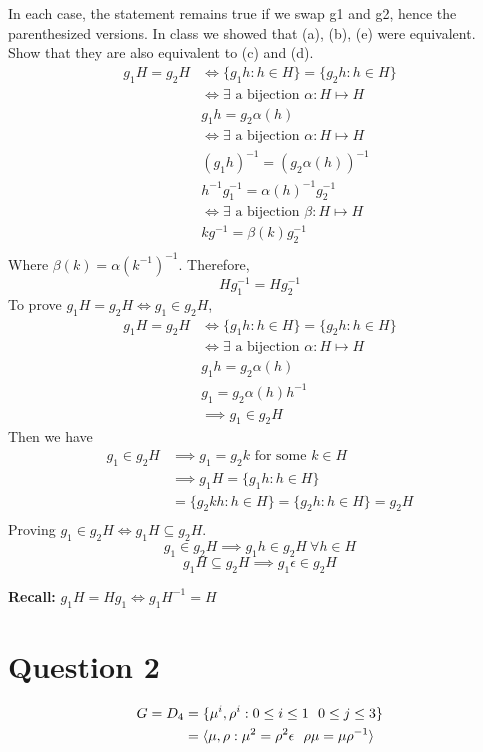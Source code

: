 \documentclass[openany]{report}
\begin{document}
In each case, the statement remains true if we swap g1 and g2, hence the parenthesized versions.
In class we showed that (a), (b), (e) were equivalent. Show that they are also equivalent to (c) and (d).
\begin{align*}
    g_1H = g_2H &\iff \{g_1h : h \in H\} = \{g_2h : h \in H\}\\
    &\iff \exists \text{ a bijection } \alpha: H \mapsto H\\
    &g_1h = g_2\alpha(h)\\
    &\iff \exists \text{ a bijection } \alpha : H \mapsto H\\
    &(g_1h)^{-1} = (g_2\alpha(h))^{-1}\\
    &h^{-1}g_1^{-1} = \alpha(h)^{-1}g_2^{-1}\\
    &\iff \exists \text{ a bijection } \beta : H \mapsto H\\
    &kg^{-1} = \beta(k)g_2^{-1}\\
\end{align*}
Where $\beta(k) = \alpha(k^{-1})^{-1}$. Therefore,
\[Hg_1^{-1} = Hg_2^{-1}\]
To prove $g_1H = g_2H \iff g_1 \in g_2H$, 
\begin{align*}
    g_1H = g_2H &\iff \{g_1h : h \in H\} = \{g_2h : h \in H\}\\
    &\iff \exists \text{ a bijection } \alpha: H \mapsto H\\
    &g_1h = g_2\alpha(h)\\
    &g_1 = g_2\alpha(h)h^{-1}\\
    &\implies g_1 \in g_2H
\end{align*}
Then we have 
\begin{align*}
    g_1 \in g_2H &\implies g_1=g_2k  \text{ for some } k \in H\\
    &\implies g_1H = \{g_1h: h \in H\}\\
    &= \{g_2kh: h \in H\} = \{g_2h: h \in H\} = g_2H\\
\end{align*}
Proving $g_1 \in g_2H \iff g_1H \subseteq g_2H$. 
\[g_1 \in g_2H \implies g_1h \in g_2H \ \forall h \in H\]
\[g_1H \subseteq g_2H \implies g_1 \epsilon \in g_2H\]
\begin{center}
    \textbf{Recall:}
    $g_1H = Hg_1 \iff g_1H^{-1 } = H$
    
\end{center}

\section{Question 2}
\begin{align*}
    G = D_4 &= \{\mu^i, \rho^i: 0 \leq i \leq 1 \ \ 0 \leq j \leq 3\}\\
    &= \bangles{\mu, \rho: \mu^2 = \rho^2 \epsilon \ \ \rho\mu=\mu\rho^{-1}}
\end{align*}
\end{document}

